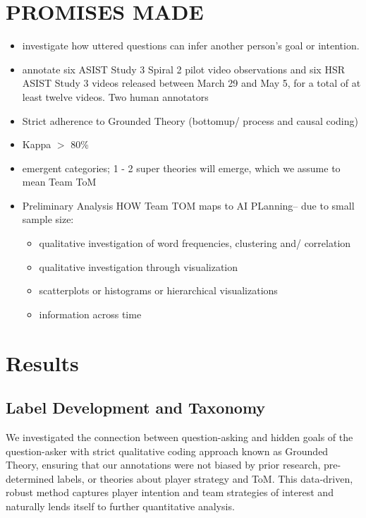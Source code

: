 \documentclass[10pt]{article}
\begin{document}
\section{PROMISES MADE}

\begin{itemize}
    \item investigate how uttered questions can infer another person's goal or intention. 
    \item  annotate six ASIST Study 3 Spiral 2 pilot video observations and
six HSR ASIST Study 3 videos released between March 29 and May 5, for a total
of at least twelve videos. Two human annotators
    \item Strict adherence to Grounded Theory (bottomup/ process and causal coding)
    \item Kappa $>$ 80\%
    \item emergent categories; 1 - 2 super theories will emerge, which we assume to mean Team ToM
    \item Preliminary Analysis HOW Team TOM maps to AI PLanning-- due to small sample size:
    \begin{itemize}
        \item qualitative investigation of word frequencies, clustering and/ correlation
        \item qualitative investigation through visualization
        \item scatterplots or histograms or hierarchical visualizations
        \item information across time
    \end{itemize}
 \end{itemize}
 





\section{Results}

\subsection{Label Development and Taxonomy}
We investigated the connection between question-asking and hidden goals of the question-asker with strict qualitative coding approach known as Grounded Theory, ensuring that our annotations were not biased by prior research, pre-determined labels, or theories about player strategy and ToM. This data-driven, robust method captures player intention and team strategies of interest and naturally lends itself to further quantitative analysis. 
\end{document}
